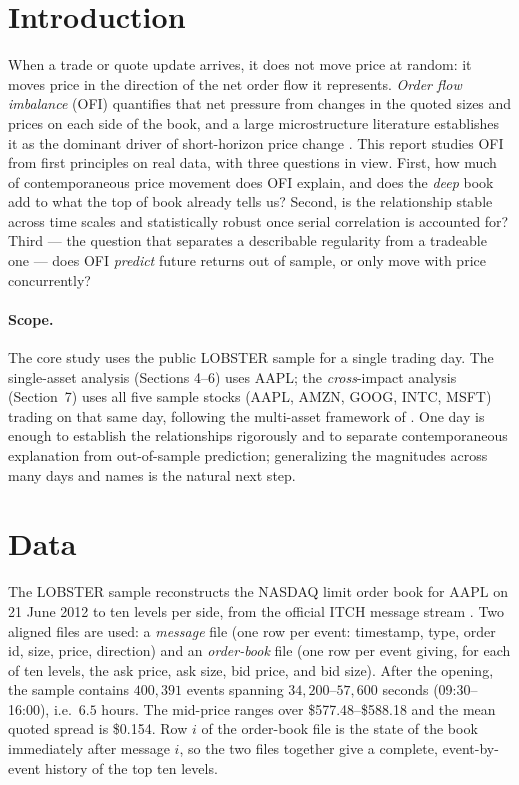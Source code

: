 \documentclass[11pt]{article}
\begin{document}
\section{Introduction}
When a trade or quote update arrives, it does not move price at random: it moves
price in the direction of the net order flow it represents. \emph{Order flow
imbalance} (OFI) quantifies that net pressure from changes in the quoted sizes and
prices on each side of the book, and a large microstructure literature establishes
it as the dominant driver of short-horizon price change \cite{cks2014}. This
report studies OFI from first principles on real data, with three questions in
view. First, how much of contemporaneous price movement does OFI explain, and does
the \emph{deep} book add to what the top of book already tells us? Second, is the
relationship stable across time scales and statistically robust once serial
correlation is accounted for? Third --- the question that separates a describable
regularity from a tradeable one --- does OFI \emph{predict} future returns out of
sample, or only move with price concurrently?

\paragraph{Scope.} The core study uses the public LOBSTER sample for a single
trading day. The single-asset analysis (Sections 4--6) uses AAPL; the
\emph{cross}-impact analysis (Section~7) uses all five sample stocks
(AAPL, AMZN, GOOG, INTC, MSFT) trading on that same day, following the multi-asset
framework of \cite{ccz2023}. One day is enough to establish the relationships
rigorously and to separate contemporaneous explanation from out-of-sample
prediction; generalizing the magnitudes across many days and names is the natural
next step.

\section{Data}
The LOBSTER sample reconstructs the NASDAQ limit order book for AAPL on
21 June 2012 to ten levels per side, from the official ITCH message stream
\cite{lobster}. Two aligned files are used: a \emph{message} file (one row per
event: timestamp, type, order id, size, price, direction) and an \emph{order-book}
file (one row per event giving, for each of ten levels, the ask price, ask size,
bid price, and bid size). After the opening, the sample contains $400{,}391$
events spanning $34{,}200$--$57{,}600$ seconds (09:30--16:00), i.e.\ $6.5$ hours.
The mid-price ranges over \$577.48--\$588.18 and the mean quoted spread is
\$0.154. Row $i$ of the order-book file is the state of the book immediately after
message $i$, so the two files together give a complete, event-by-event history of
the top ten levels.
\end{document}
